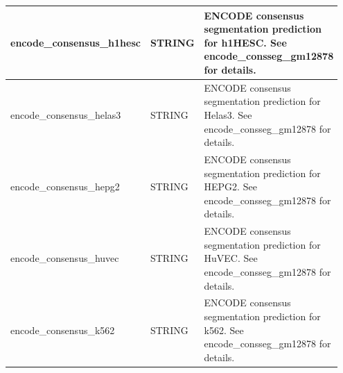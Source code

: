 \documentclass[letterpaper,10pt,english]{sphinxmanual}
\begin{document}
\begin{tabular}{|p{0.317\linewidth}|p{0.317\linewidth}|p{0.317\linewidth}|}
encode\_consensus\_h1hesc
 & 
STRING
 & 
ENCODE consensus segmentation prediction for h1HESC.  See encode\_consseg\_gm12878 for details.
\\\hline

encode\_consensus\_helas3
 & 
STRING
 & 
ENCODE consensus segmentation prediction for Helas3.  See encode\_consseg\_gm12878 for details.
\\\hline

encode\_consensus\_hepg2
 & 
STRING
 & 
ENCODE consensus segmentation prediction for HEPG2.   See encode\_consseg\_gm12878 for details.
\\\hline

encode\_consensus\_huvec
 & 
STRING
 & 
ENCODE consensus segmentation prediction for HuVEC.   See encode\_consseg\_gm12878 for details.
\\\hline

encode\_consensus\_k562
 & 
STRING
 & 
ENCODE consensus segmentation prediction for k562.    See encode\_consseg\_gm12878 for details.
\\\hline
\end{tabular}


\begin{DUlineblock}{0em}
\item[] 
\end{DUlineblock}
\end{document}
